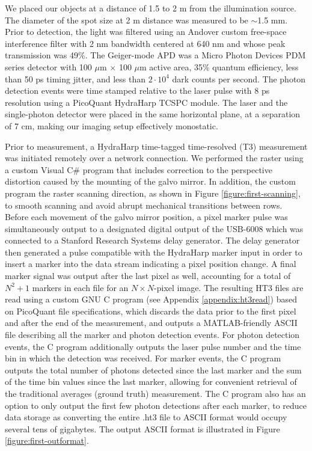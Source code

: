 We placed our objects at a distance of 1.5 to 2 m from the illumination source. The diameter of the spot size at 2 m distance was measured to be $\sim$1.5 mm. Prior to detection, the light was filtered using an Andover custom free-space interference filter with 2 nm bandwidth centered at 640 nm and whose peak transmission was 49\%. The Geiger-mode APD was a Micro Photon Devices PDM series detector with 100 $\mu$m $\times$ 100 $\mu$m active area, 35\% quantum efficiency, less than 50 ps timing jitter, and less than $2\cdot 10^4$ dark counts per second. The photon detection events were time stamped relative to the laser pulse with 8 ps resolution using a PicoQuant HydraHarp TCSPC module. The laser and the single-photon detector were placed in the same horizontal plane, at a separation of 7 cm, making our imaging setup effectively monostatic.

Prior to measurement, a HydraHarp time-tagged time-resolved (T3) measurement was initiated remotely over a network connection. We performed the raster using a custom Visual C\# program that includes correction to the perspective distortion caused by the mounting of the galvo mirror. In addition, the custom program the raster scanning direction, as shown in Figure \ref{figure:first-scanning}, to smooth scanning and avoid abrupt mechanical transitions between rows. Before each movement of the galvo mirror position, a pixel marker pulse was simultaneously output to a designated digital output of the USB-6008 which was connected to a Stanford Research Systems delay generator. The delay generator then generated a pulse compatible with the HydraHarp marker input in order to insert a marker into the data stream indicating a pixel position change. A final marker signal was output after the last pixel as well, accounting for a total of $N^2+1$ markers in each file for an $N \times N$-pixel image. The resulting HT3 files are read using a custom GNU C program (see Appendix \ref{appendix:ht3read}) based on PicoQuant file specifications, which discards the data prior to the first pixel and after the end of the measurement, and outputs a MATLAB-friendly ASCII file describing all the marker and photon detection events. For photon detection events, the C program additionally outputs the laser pulse number and the time bin in which the detection was received. For marker events, the C program outputs the total number of photons detected since the last marker and the sum of the time bin values since the last marker, allowing for convenient retrieval of the traditional averages (ground truth) measurement. The C program also has an option to only output the first few photon detections after each marker, to reduce data storage as converting the entire .ht3 file to ASCII format would occupy several tens of gigabytes. The output ASCII format is illustrated in Figure \ref{figure:first-outformat}.

